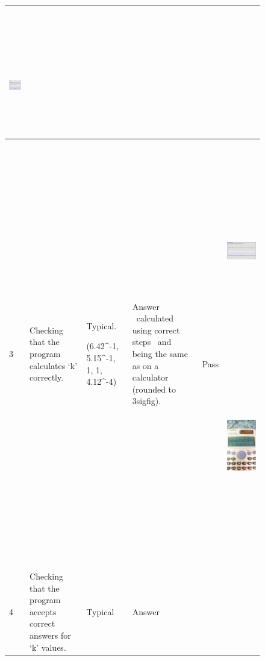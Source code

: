 \documentclass[letterpaper]{article}
\begin{document}
\begin{figure}[hbp]
\begin{minipage}{12.1146in}
\begin{flushleft}
\begin{supertabular}{|m{0.8913598in}|m{1.0997599in}|m{3.3018599in}|m{0.8809598in}|m{0.6198598in}|m{4.84626in}|}
{\color{black} ~}

 \includegraphics[width=2.0937in,height=1.6874in]{Tests_files/image003.jpg} \\\hline
{\color{black} 3} &
{\color{black} Checking that the program calculates `k' correctly.} &
{\color{black} Typical.}

{\color{black} (6.42\^{}-1, 5.15\^{}-1, 1, 1, 4.12\^{}-4)} &
{\color{black} Answer ~calculated using correct steps ~and being the same as on a calculator (rounded to 3sigfig).} &
{\color{black} ~}

{\color{black} Pass} &
{\color{black} ~}

 \includegraphics[width=4.7602in,height=2.8126in]{Tests_files/image004.jpg} 
\includegraphics[width=2.1563in,height=3.8228in]{Tests_files/image005.jpg} \\\hline
{\color{black} 4} &
{\color{black} Checking that the program accepts correct answers for `k' values.} &
{\color{black} Typical} &
{\color{black} Answer}


\end{supertabular}
\end{flushleft}
\end{minipage}
\end{figure}
\end{document}
